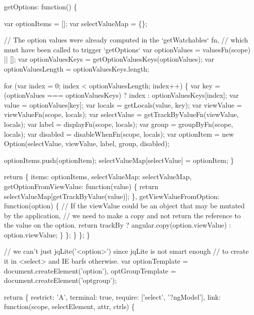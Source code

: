 \begin{DoxyCodeInclude}
{{{      getOptions: \textcolor{keyword}{function}() \{

        var optionItems = [];
        var selectValueMap = \{\};

        \textcolor{comment}{// The option values were already computed in the `getWatchables` fn,}
        \textcolor{comment}{// which must have been called to trigger `getOptions`}
        var optionValues = valuesFn(scope) || [];
        var optionValuesKeys = getOptionValuesKeys(optionValues);
        var optionValuesLength = optionValuesKeys.length;

        \textcolor{keywordflow}{for} (var index = 0; index < optionValuesLength; index++) \{
          var key = (optionValues === optionValuesKeys) ? index : optionValuesKeys[index];
          var value = optionValues[key];
          var locals = getLocals(value, key);
          var viewValue = viewValueFn(scope, locals);
          var selectValue = getTrackByValueFn(viewValue, locals);
          var label = displayFn(scope, locals);
          var group = groupByFn(scope, locals);
          var disabled = disableWhenFn(scope, locals);
          var optionItem = \textcolor{keyword}{new} Option(selectValue, viewValue, label, group, disabled);

          optionItems.push(optionItem);
          selectValueMap[selectValue] = optionItem;
        \}

        \textcolor{keywordflow}{return} \{
          items: optionItems,
          selectValueMap: selectValueMap,
          getOptionFromViewValue: \textcolor{keyword}{function}(value) \{
            \textcolor{keywordflow}{return} selectValueMap[getTrackByValue(value)];
          \},
          getViewValueFromOption: \textcolor{keyword}{function}(option) \{
            \textcolor{comment}{// If the viewValue could be an object that may be mutated by the application,}
            \textcolor{comment}{// we need to make a copy and not return the reference to the value on the option.}
            \textcolor{keywordflow}{return} trackBy ? angular.copy(option.viewValue) : option.viewValue;
          \}
        \};
      \}
    \};
  \}


  \textcolor{comment}{// we can't just jqLite('<option>') since jqLite is not smart enough}
  \textcolor{comment}{// to create it in <select> and IE barfs otherwise.}
  var optionTemplate = document.createElement(\textcolor{stringliteral}{'option'}),
      optGroupTemplate = document.createElement(\textcolor{stringliteral}{'optgroup'});

  \textcolor{keywordflow}{return} \{
    restrict: \textcolor{charliteral}{'A'},
    terminal: \textcolor{keyword}{true},
    require: [\textcolor{stringliteral}{'select'}, \textcolor{stringliteral}{'?ngModel'}],
    link: \textcolor{keyword}{function}(scope, selectElement, attr, ctrls) \{

}}}
\end{DoxyCodeInclude}
